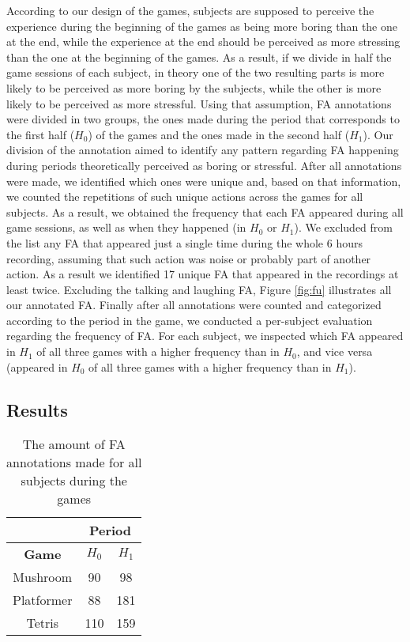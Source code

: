 According to our design of the games, subjects are supposed to perceive the experience during the beginning of the games as being more boring than the one at the end, while the experience at the end should be perceived as more stressing than the one at the beginning of the games. As a result, if we divide in half the game sessions of each subject, in theory one of the two resulting parts is more likely to be perceived as more boring by the subjects, while the other is more likely to be perceived as more stressful. Using that assumption, FA annotations were divided in two groups, the ones made during the period that corresponds to the first half ($H_0$) of the games and the ones made in the second half ($H_1$). Our division of the annotation aimed to identify any pattern regarding FA happening during periods theoretically perceived as boring or stressful. After all annotations were made, we identified which ones were unique and, based on that information, we counted the repetitions of such unique actions across the games for all subjects. As a result, we obtained the frequency that each FA appeared during all game sessions, as well as when they happened (in $H_0$ or $H_1$). We excluded from the list any FA that appeared just a single time during the whole 6 hours recording, assuming that such action was noise or probably part of another action. As a result we identified 17 unique FA that appeared in the recordings at least twice. Excluding the talking and laughing FA, Figure \ref{fig:fu} illustrates all our annotated FA. Finally after all annotations were counted and categorized according to the period in the game, we conducted a per-subject evaluation regarding the frequency of FA. For each subject, we inspected which FA appeared in $H_1$ of all three games with a higher frequency than in $H_0$, and vice versa (appeared in $H_0$ of all three games with a higher frequency than in $H_1$).

\subsection{Results}

\begin{table}[!t]
\renewcommand{\arraystretch}{1.3}
\caption{The amount of FA annotations made for all subjects during the games}
\label{table:amount-fa}
\centering
\begin{tabular}{|c|c|c|}
\cline{2-3}
\multicolumn{1}{c|}{} & \multicolumn{2}{|c|}{\textbf{Period}} \\
\hline
\textbf{Game} & $H_0$ & $H_1$ \\
\hline
Mushroom   & 90 & 98 \\
\hline
Platformer & 88 & 181 \\
\hline
Tetris     & 110 & 159 \\
\hline
\end{tabular}
\end{table}

